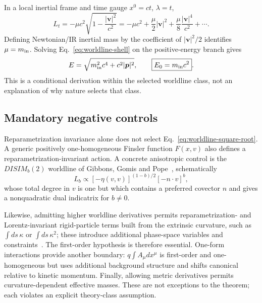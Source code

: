 \documentclass[11pt,a4paper]{article}
\begin{document}
In a local inertial frame and time gauge $x^0=ct$, $\lambda=t$,
\begin{equation}
L_t=-\mu c^2\sqrt{1-\frac{|\bm v|^2}{c^2}}
=-\mu c^2+\frac{\mu}{2}|\bm v|^2+\frac{\mu}{8}\frac{|\bm v|^4}{c^2}+\cdots.
\end{equation}
Defining Newtonian/IR inertial mass by the coefficient of $|\bm v|^2/2$ identifies $\mu=m_{\rm in}$.  Solving Eq.~\eqref{eq:worldline-shell} on the positive-energy branch gives
\begin{equation}
E=\sqrt{m_{\rm in}^2c^4+c^2|\bm p|^2},\qquad
\boxed{E_0=m_{\rm in}c^2}.
\end{equation}
This is a conditional derivation within the selected worldline class, not an explanation of why nature selects that class.

\subsection{Mandatory negative controls}
Reparametrization invariance alone does not select Eq.~\eqref{eq:worldline-square-root}.  A generic positively one-homogeneous Finsler function $F(x,v)$ also defines a reparametrization-invariant action.  A concrete anisotropic control is the $DISIM_b(2)$ worldline of Gibbons, Gomis and Pope~\cite{gibbons2007finsler}, schematically
\begin{equation}
L_b\propto[-\eta(v,v)]^{(1-b)/2}[-n\!\cdot\!v]^b,
\end{equation}
whose total degree in $v$ is one but which contains a preferred covector $n$ and gives a nonquadratic dual indicatrix for $b\neq0$.

Likewise, admitting higher worldline derivatives permits reparametrization- and Lorentz-invariant rigid-particle terms built from the extrinsic curvature, such as $\int ds\,\kappa$ or $\int ds\,\kappa^2$; these introduce additional phase-space variables and constraints~\cite{deriglazov2013rigid}.  The first-order hypothesis is therefore essential.  One-form interactions provide another boundary: $q\int A_\mu dx^\mu$ is first-order and one-homogeneous but uses additional background structure and shifts canonical relative to kinetic momentum.  Finally, allowing metric derivatives permits curvature-dependent effective masses.  These are not exceptions to the theorem; each violates an explicit theory-class assumption.
\end{document}
